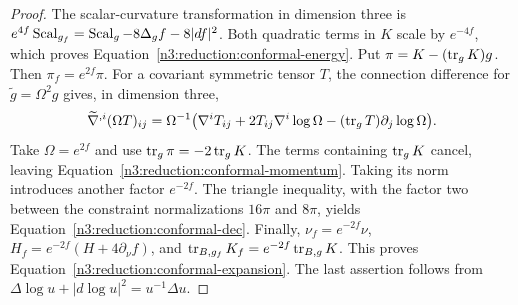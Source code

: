 \begin{proof}
The scalar-curvature transformation in dimension three is
$e^{4f}\operatorname{Scal}_{g_f}=\operatorname{Scal}_g-8\Delta_g f-8|df|^2$.
Both quadratic terms in $K$ scale by $e^{-4f}$, which proves
Equation~\eqref{n3:reduction:conformal-energy}.
Put $\pi=K-(\operatorname{tr}_gK)g$.  Then
$\pi_f=e^{2f}\pi$.  For a covariant symmetric tensor $T$, the connection
difference for $\widetilde g=\Omega^2g$ gives, in dimension three,
\[
 \widetilde\nabla^{,i}(\Omega T)_{ij}
 =\Omega^{-1}\bigl(\nabla^iT_{ij}
          +2T_{ij}\nabla^i\log\Omega
          -(\operatorname{tr}_gT)\partial_j\log\Omega\bigr).
\]
Take $\Omega=e^{2f}$ and use $\operatorname{tr}_g\pi=-2\operatorname{tr}_gK$.
The terms containing $\operatorname{tr}_gK$ cancel, leaving
Equation~\eqref{n3:reduction:conformal-momentum}.  Taking its norm introduces
another factor $e^{-2f}$.  The triangle inequality, with the factor two
between the constraint normalizations $16\pi$ and $8\pi$, yields
Equation~\eqref{n3:reduction:conformal-dec}.
Finally, $\nu_f=e^{-2f}\nu$,
$H_f=e^{-2f}(H+4\partial_\nu f)$, and
$\operatorname{tr}_{B,g_f}K_f=e^{-2f}\operatorname{tr}_{B,g}K$.  This proves
Equation~\eqref{n3:reduction:conformal-expansion}.  The last assertion follows
from $\Delta\log u+|d\log u|^2=u^{-1}\Delta u$.
\end{proof}

